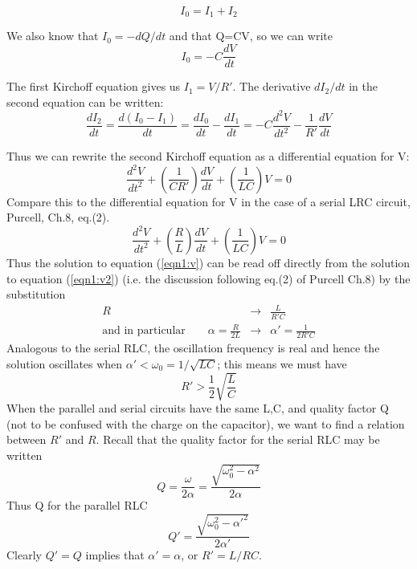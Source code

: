 \documentclass[solutions]{esg8022pset}
\begin{document}
\begin{equation}
I_0=I_1+I_2
\end{equation}

We also know that $I_0=-dQ/dt$ and that Q=CV, so we can write
\begin{equation}
I_0=-C\frac{dV}{dt}
\end{equation}

The first Kirchoff equation gives us $I_1=V/R'$. The derivative
$dI_2/dt$ in the second equation can be written:
\begin{equation}
\frac{dI_2}{dt}=\frac{d(I_0-I_1)}{dt}=\frac{dI_0}{dt}-\frac{dI_1}{dt}=-C\frac{d^2V}{dt^2}-\frac{1}{R'}\frac{dV}{dt}
\end{equation}

Thus we can rewrite the second Kirchoff equation as a differential
equation for V:
\begin{equation}\label{eqn1:v}
\frac{d^2V}{dt^2}+\left(\frac{1}{CR'}\right)\frac{dV}{dt}+\left(\frac{1}{LC}\right)V=0
\end{equation}
Compare this to the differential equation for V in the case of a
serial LRC circuit, Purcell, Ch.8, eq.(2).
\begin{equation}\label{eqn1:v2}
\frac{d^2V}{dt^2}+\left(\frac{R}{L}\right)\frac{dV}{dt}+\left(\frac{1}{LC}\right)V=0
\end{equation}
Thus the solution to equation (\ref{eqn1:v}) can be read off directly
from the solution to equation (\ref{eqn1:v2}) (i.e. the discussion
following eq.(2) of Purcell Ch.8) by the substitution
\begin{eqnarray}
R &\rightarrow & \frac{L}{R'C}\\ \textrm{and in particular}\qquad
\alpha=\frac{R}{2L} &\rightarrow & \alpha'=\frac{1}{2R'C}
\end{eqnarray}
Analogous to the serial RLC, the oscillation frequency is real and hence
the solution oscillates when $\alpha'<\omega_0=1/\sqrt{LC}$; this
means we must have
\begin{equation}
R'>\frac{1}{2}\sqrt{\frac{L}{C}}
\end{equation}
When the parallel and serial circuits have the same L,C, and quality
factor Q (not to be confused with the charge on the capacitor), we
want to find a relation between $R'$ and $R$.  Recall that the quality
factor for the serial RLC may be written
\begin{equation}
Q=\frac{\omega}{2\alpha}=\frac{\sqrt{\omega_0^2-\alpha^2}}{2\alpha}
\end{equation}
Thus Q for the parallel RLC
\begin{equation}
Q'=\frac{\sqrt{\omega_0^2-\alpha'^2}}{2\alpha'}
\end{equation}
Clearly $Q'=Q$ implies that $\alpha'=\alpha$, or $R'=L/RC$.
\end{document}
